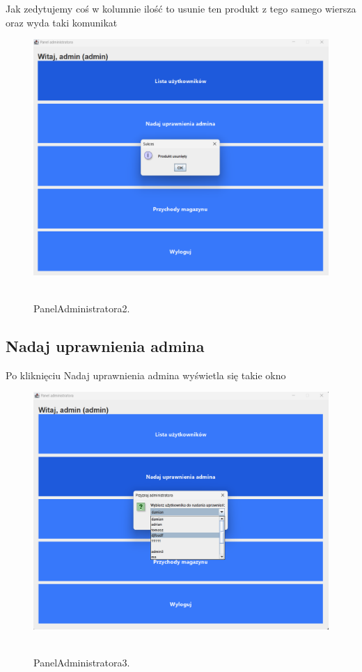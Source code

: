 Jak zedytujemy coś w kolumnie ilość to usunie ten produkt z tego samego wiersza oraz wyda taki komunikat

\begin{figure}[H]
    \centering
    \includegraphics[width=.9\linewidth]{figures/PanelAdministratora2.png}\
    \caption{PanelAdministratora2.\label{PanelAdministratora2}}
\end{figure}


\subsection{Nadaj uprawnienia admina}
\label{subsec:Nadaj uprawnienia admina}

Po kliknięciu Nadaj uprawnienia admina wyświetla się takie okno 

\begin{figure}[H]
    \centering
    \includegraphics[width=.9\linewidth]{figures/PanelAdministratora3.png}\
    \caption{PanelAdministratora3.\label{PanelAdministratora3}}
\end{figure}

